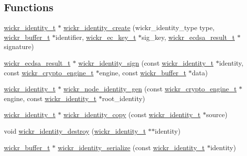 \subsection*{Functions}
\begin{DoxyCompactItemize}
\item 
\mbox{\hyperlink{structwickr__identity}{wickr\+\_\+identity\+\_\+t}} $\ast$ \mbox{\hyperlink{group__wickr__identity_ga75bfef275a250a32784231e8c042913b}{wickr\+\_\+identity\+\_\+create}} (wickr\+\_\+identity\+\_\+type type, \mbox{\hyperlink{structwickr__buffer}{wickr\+\_\+buffer\+\_\+t}} $\ast$identifier, \mbox{\hyperlink{structwickr__ec__key}{wickr\+\_\+ec\+\_\+key\+\_\+t}} $\ast$sig\+\_\+key, \mbox{\hyperlink{structwickr__ecdsa__result}{wickr\+\_\+ecdsa\+\_\+result\+\_\+t}} $\ast$signature)
\item 
\mbox{\hyperlink{structwickr__ecdsa__result}{wickr\+\_\+ecdsa\+\_\+result\+\_\+t}} $\ast$ \mbox{\hyperlink{group__wickr__identity_ga32097764e57e70d85a2e1277146495c9}{wickr\+\_\+identity\+\_\+sign}} (const \mbox{\hyperlink{structwickr__identity}{wickr\+\_\+identity\+\_\+t}} $\ast$identity, const \mbox{\hyperlink{structwickr__crypto__engine}{wickr\+\_\+crypto\+\_\+engine\+\_\+t}} $\ast$engine, const \mbox{\hyperlink{structwickr__buffer}{wickr\+\_\+buffer\+\_\+t}} $\ast$data)
\item 
\mbox{\hyperlink{structwickr__identity}{wickr\+\_\+identity\+\_\+t}} $\ast$ \mbox{\hyperlink{group__wickr__identity_gae820c1efc090fef6a8d27dd700316023}{wickr\+\_\+node\+\_\+identity\+\_\+gen}} (const \mbox{\hyperlink{structwickr__crypto__engine}{wickr\+\_\+crypto\+\_\+engine\+\_\+t}} $\ast$engine, const \mbox{\hyperlink{structwickr__identity}{wickr\+\_\+identity\+\_\+t}} $\ast$root\+\_\+identity)
\item 
\mbox{\hyperlink{structwickr__identity}{wickr\+\_\+identity\+\_\+t}} $\ast$ \mbox{\hyperlink{group__wickr__identity_ga14d1fb3ddd1dbd7797eb9b628eef99fe}{wickr\+\_\+identity\+\_\+copy}} (const \mbox{\hyperlink{structwickr__identity}{wickr\+\_\+identity\+\_\+t}} $\ast$source)
\item 
void \mbox{\hyperlink{group__wickr__identity_ga9e4a0f3736d52836c9a9fc61794c8ddd}{wickr\+\_\+identity\+\_\+destroy}} (\mbox{\hyperlink{structwickr__identity}{wickr\+\_\+identity\+\_\+t}} $\ast$$\ast$identity)
\item 
\mbox{\hyperlink{structwickr__buffer}{wickr\+\_\+buffer\+\_\+t}} $\ast$ \mbox{\hyperlink{group__wickr__identity_ga79ca0713d0b90873e584379f26cbd051}{wickr\+\_\+identity\+\_\+serialize}} (const \mbox{\hyperlink{structwickr__identity}{wickr\+\_\+identity\+\_\+t}} $\ast$identity)
$$
\end{DoxyCompactItemize}
